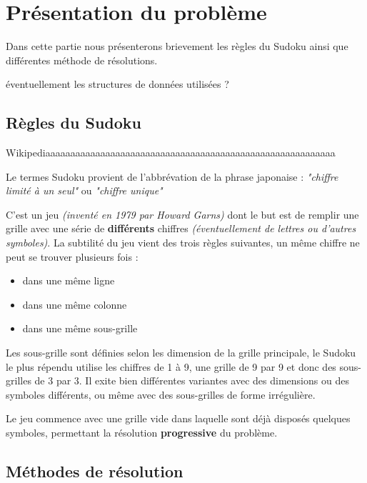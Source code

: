 

\chapter{Présentation du problème}
  
Dans cette partie nous présenterons brievement les règles du Sudoku ainsi que différentes méthode de résolutions.

\textcolor{BurntOrange}{éventuellement les structures de données utilisées ?}

\section{Règles du Sudoku}

\textcolor{BurntOrange}{Wikipediaaaaaaaaaaaaaaaaaaaaaaaaaaaaaaaaaaaaaaaaaaaaaaaaaaaaaaaaaa}


Le termes Sudoku provient de l'abbrévation de la phrase japonaise : \textit{"chiffre limité à un seul"} ou \textit{"chiffre unique"}

C'est un jeu \textit{(inventé en 1979 par Howard Garns)} dont le but est de remplir une grille avec une série de \textbf{différents} chiffres \textit{(éventuellement de lettres ou d'autres symboles)}. La subtilité du jeu vient des trois règles suivantes, un même chiffre ne peut se trouver plusieurs fois :

\begin{itemize}

\item dans une même ligne
\item dans une même colonne
\item dans une même sous-grille

\end{itemize}

Les sous-grille sont définies selon les dimension de la grille principale, le Sudoku le plus répendu utilise les chiffres de 1 à 9, une grille de 9 par 9 et donc des sous-grilles de 3 par 3. Il exite bien différentes variantes avec des dimensions ou des symboles différents, ou même avec des sous-grilles de forme irrégulière.

Le jeu commence avec une grille vide dans laquelle sont déjà disposés quelques symboles, permettant la résolution \textbf{progressive} du problème.




\section{Méthodes de résolution}
